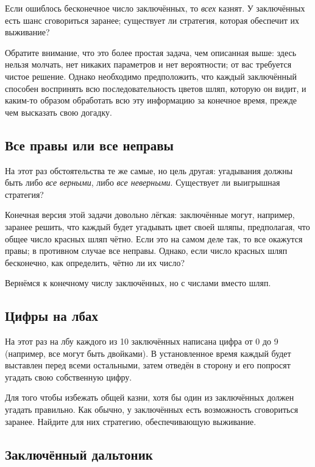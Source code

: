 Если ошиблось бесконечное число заключённых, то \emph{всех} казнят. 
У заключённых есть шанс сговориться заранее;
существует ли стратегия, которая обеспечит их выживание?

Обратите внимание, что это более простая задача, чем описанная выше:
здесь нельзя молчать, нет никаких параметров и нет вероятности;
от вас требуется чистое решение.
Однако необходимо предположить, что каждый заключённый способен воспринять всю последовательность цветов шляп, которую он видит, и каким-то образом обработать всю эту информацию за конечное время, прежде чем высказать свою догадку.

\subsection*{Все правы или все неправы}

На этот раз обстоятельства те же самые, но цель другая:
угадывания должны быть либо \emph{все верными}, либо \emph{все неверными}.
Существует ли выигрышная стратегия?

Конечная версия этой задачи довольно лёгкая:
заключённые могут, например, заранее решить, что каждый будет угадывать цвет своей шляпы, предполагая, что общее число красных шляп чётно.
Если это на самом деле так, то все окажутся правы;
в противном случае все неправы.
Однако, если число красных шляп бесконечно, как определить, чётно ли их число?

\medskip

Вернёмся к конечному числу заключённых, но с числами вместо шляп.

\subsection*{Цифры на лбах}

На этот раз на лбу каждого из 10 заключённых написана цифра от 0 до 9 (например, все могут быть двойками).
В установленное время каждый будет выставлен перед всеми остальными, затем отведён в сторону и его попросят угадать свою собственную цифру.

Для того чтобы избежать общей казни, хотя бы один из заключённых должен угадать правильно.
Как обычно, у заключённых есть возможность сговориться заранее.
Найдите для них стратегию, обеспечивающую выживание.

\subsection*{Заключённый дальтоник}

